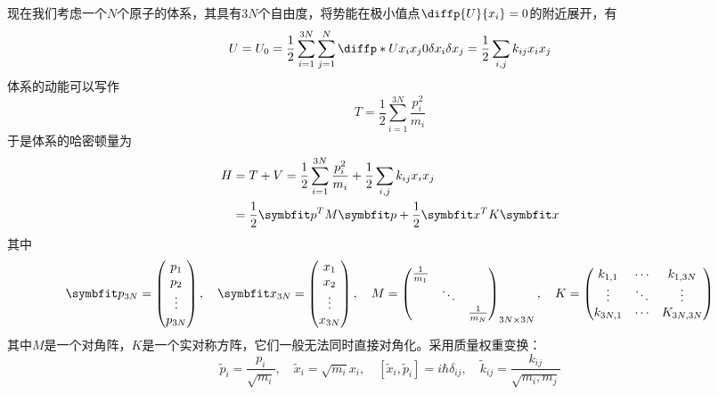 现在我们考虑一个$N$个原子的体系，其具有$3N$个自由度，将势能在极小值点$\diffp{U}{{x_i}}=0$的附近展开，有\begin{equation}
    U=U_0 =\frac{1}{2} \sum_{i=1}^{3N} \sum_{j=1}^N \diffp*{U}{{x_i}{x_j}}{0} \delta x_i \delta x_j=\frac{1}{2} \sum_{i,j} k_{ij} x_i x_j
\end{equation}
体系的动能可以写作\begin{equation}
    T=\frac{1}{2} \sum_{i=1}^{3N} \frac{p_i^2}{m_i}
\end{equation}
于是体系的哈密顿量为\begin{equation}
\begin{aligned}
    H&=T+V = \frac{1}{2} \sum_{i=1}^{3N} \frac{p_i^2}{m_i} +\frac{1}{2} \sum_{i,j} k_{ij} x_i x_j\\
    &=\frac{1}{2} \bd{p}^T M \bd{p} +\frac{1}{2}\bd{x}^T K \bd{x}
\end{aligned}
\end{equation}
其中\begin{equation}
    \bd{p}_{3N} =\begin{pmatrix}
        p_1\\
        p_2\\
        \vdots\\
        p_{3N}
    \end{pmatrix},\quad\bd{x}_{3N} =\begin{pmatrix}
        x_1\\
        x_2\\
        \vdots\\
        x_{3N}
    \end{pmatrix},\quad M= \begin{pmatrix}
        \frac{1}{m_1} & & \\
        & \ddots & \\
        & & \frac{1}{m_N}
    \end{pmatrix}_{3N\times 3N},\quad K= \begin{pmatrix}
        k_{1,1} & \cdots &k_{1,3N}\\
        \vdots & \ddots & \vdots\\
        k_{3N,1} & \cdots & K_{3N,3N}
    \end{pmatrix}
\end{equation}
其中$M$是一个对角阵，$K$是一个实对称方阵，它们一般无法同时直接对角化。采用质量权重变换：\begin{equation}
    \widetilde{p}_i = \frac{p_i}{\sqrt{m_i}} ,\quad \widetilde{x}_i =\sqrt{m_i} x_i,\quad[\widetilde{x}_i,\widetilde{p}_i]=i\hbar \delta_{ij},\quad \widetilde{k}_{ij} =\frac{k_{ij}}{\sqrt{m_i,m_j}}
\end{equation}
